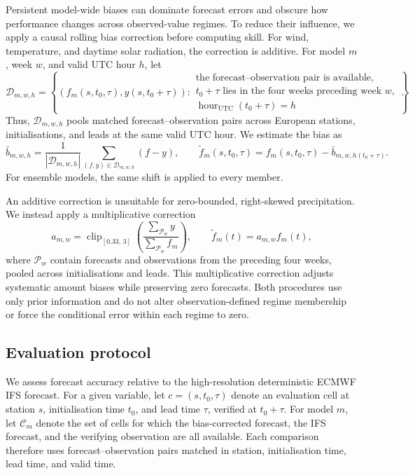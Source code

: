 \documentclass{article}
\begin{document}
Persistent model-wide biases can dominate forecast errors and obscure how
performance changes across observed-value regimes. To reduce their
influence, we apply a causal rolling bias correction before computing skill.
For wind, temperature, and daytime solar radiation, the correction is
additive. For model \(m\), week \(w\), and valid UTC hour \(h\), let
\begin{equation}
\mathcal{D}_{m,w,h}
=
\left\{
\left(f_m(s,t_0,\tau),y(s,t_0+\tau)\right):
\begin{array}{l}
\text{the forecast--observation pair is available},\\
t_0+\tau \text{ lies in the four weeks preceding week } w,\\
\operatorname{hour}_{\mathrm{UTC}}(t_0+\tau)=h
\end{array}
\right\}.
\end{equation}
Thus, \(\mathcal{D}_{m,w,h}\) pools matched forecast--observation pairs
across European stations, initialisations, and leads at the same valid UTC
hour. We estimate the bias as
\begin{equation}
\bar b_{m,w,h}
=
\frac{1}{|\mathcal{D}_{m,w,h}|}
\sum_{(f,y)\in\mathcal{D}_{m,w,h}}(f-y),
\qquad
\widetilde f_m(s,t_0,\tau)
=
f_m(s,t_0,\tau)-\bar b_{m,w,h(t_0+\tau)}.
\end{equation}
For ensemble models, the same shift is applied to every member.

An additive correction is unsuitable for zero-bounded, right-skewed
precipitation. We instead apply a multiplicative correction
\begin{equation}
a_{m,w}
=
\operatorname{clip}_{[0.33,\,3]}
\left(
\frac{\sum_{\mathcal{P}_w}y}
     {\sum_{\mathcal{P}_w}f_m}
\right),
\qquad
\widetilde f_m(t)=a_{m,w}f_m(t),
\end{equation}
where \(\mathcal{P}_w\) contain forecasts and observations from
the preceding four weeks, pooled across initialisations and leads.
This multiplicative correction adjusts systematic amount biases while
preserving zero forecasts. Both procedures use only prior information and do
not alter observation-defined regime membership or force the conditional
error within each regime to zero.

\subsection{Evaluation protocol}
\label{sec:aggregation}

We assess forecast accuracy relative to the high-resolution deterministic
ECMWF IFS forecast. For a given variable, let
\(c=(s,t_0,\tau)\) denote an evaluation cell at station \(s\),
initialisation time \(t_0\), and lead time \(\tau\), verified at
\(t_0+\tau\). For model \(m\), let \(\mathcal{C}_m\) denote the set of cells
for which the bias-corrected forecast, the IFS forecast, and the verifying
observation are all available. Each comparison therefore uses
forecast--observation pairs matched in station, initialisation time, lead
time, and valid time.
\end{document}

